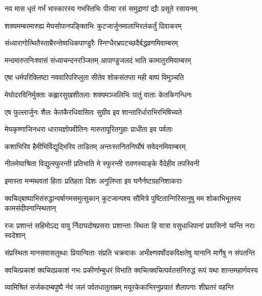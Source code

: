 \twolineshloka
{नव मास धृतं गर्भं भास्कारस्य गभस्तिभिः}
{पीत्वा रसं समुद्राणां द्यौः प्रसूते रसायनम्} %

\twolineshloka
{शक्यमम्बरमारुह्य मेघसोपानपङ्क्तिभिः}
{कुटजार्जुनमालाभिरलंकर्तुं दिवाकरम्} %

\twolineshloka
{संध्यारागोत्थितैस्ताम्रैरन्तेष्वधिकपाण्डुरैः}
{स्निग्धैरभ्रपटच्छदैर्बद्धव्रणमिवाम्बरम्} %

\twolineshloka
{मन्दमारुतनिःश्वासं संध्याचन्दनरञ्जितम्}
{आपाण्डुजलदं भाति कामातुरमिवाम्बरम्} %

\twolineshloka
{एषा धर्मपरिक्लिष्टा नववारिपरिप्लुता}
{सीतेव शोकसंतप्ता मही बाष्पं विमुञ्चति} %

\twolineshloka
{मेघोदरविनिर्मुक्ताः कह्लारसुखशीतलाः}
{शक्यमञ्जलिभिः पातुं वाताः केतकिगन्धिनः} %

\twolineshloka
{एष फुल्लार्जुनः शैलः केतकैरधिवासितः}
{सुग्रीव इव शान्तारिर्धाराभिरभिषिच्यते} %

\twolineshloka
{मेघकृष्णाजिनधरा धारायज्ञोपवीतिनः}
{मारुतापूरितगुहाः प्राधीता इव पर्वताः} %

\twolineshloka
{कशाभिरिव हैमीभिर्विद्युद्भिरिव ताडितम्}
{अन्तःस्तनितनिर्घोषं सवेदनमिवाम्बरम्} %

\twolineshloka
{नीलमेघाश्रिता विद्युत्स्फुरन्ती प्रतिभाति मे}
{स्फुरन्ती रावणस्याङ्के वैदेहीव तपस्विनी} %

\twolineshloka
{इमास्ता मन्मथवतां हिताः प्रतिहता दिशः}
{अनुलिप्ता इव घनैर्नष्टग्रहनिशाकराः} %

\threelineshloka
{क्वचिद्बाष्पाभिसंरुद्धान्वर्षागमसमुत्सुकान्}
{कुटजान्पश्य सौमित्रे पुष्टितान्गिरिसानुषु}
{मम शोकाभिभूतस्य कामसंदीपनान्स्थितान्} %

\fourlineindentedshloka
{रजः प्रशान्तं सहिमोऽद्य वायु}
{र्निदाघदोषप्रसराः प्रशान्ताः}
{स्थिता हि यात्रा वसुधाधिपानां}
{ प्रवासिनो यान्ति नराः स्वदेशान्} %

\fourlineindentedshloka
{संप्रस्थिता मानसवासलुब्धाः}
{ प्रियान्विताः संप्रति चक्रवाकः}
{अभीक्ष्णवर्षोदकविक्षतेषु}
{ यानानि मार्गेषु न संपतन्ति} %

\fourlineindentedshloka
{क्वचित्प्रकाशं क्वचिदप्रकाशं}
{ नभः प्रकीर्णाम्बुधरं विभाति}
{क्वचित्क्वचित्पर्वतसंनिरुद्धं}
{ रूपं यथा शान्तमहार्णवस्य} %

\fourlineindentedshloka
{व्यामिश्रितं सर्जकदम्बपुष्पै}
{र्नवं जलं पर्वतधातुताम्रम्}
{मयूरकेकाभिरनुप्रयातं}
{ शैलापगाः शीघ्रतरं वहन्ति} %

